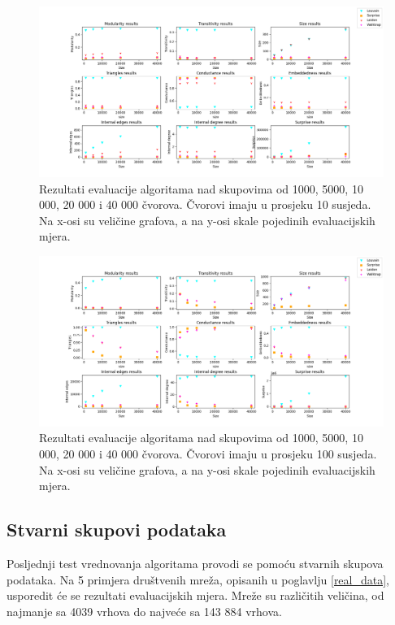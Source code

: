 \begin{figure}
	\includegraphics[width=\linewidth]{images/test2_10.png}
	\caption{Rezultati evaluacije algoritama nad skupovima od 1000, 5000, 10 000, 20 000 i 40 000 čvorova. Čvorovi imaju u prosjeku 10 susjeda. Na x-osi su veličine grafova, a na y-osi skale pojedinih evaluacijskih mjera.}
	\label{fig:test2_10}
\end{figure}

\begin{figure}
	\includegraphics[width=\linewidth]{images/test2_100.png}
	\caption{Rezultati evaluacije algoritama nad skupovima od 1000, 5000, 10 000, 20 000 i 40 000 čvorova. Čvorovi imaju u prosjeku 100 susjeda. Na x-osi su veličine grafova, a na y-osi skale pojedinih evaluacijskih mjera.}
	\label{fig:test2_100}
\end{figure}


\subsection{Stvarni skupovi podataka}

Posljednji test vrednovanja algoritama provodi se pomoću stvarnih skupova podataka. Na 5 primjera društvenih mreža, opisanih u poglavlju \ref{real_data}, usporedit će se rezultati evaluacijskih mjera. Mreže su različitih veličina, od najmanje sa 4039 vrhova do najveće sa 143 884 vrhova.


